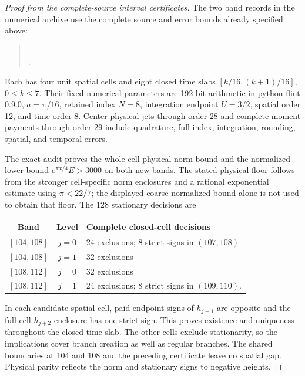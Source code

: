 \documentclass[11pt]{article}
\numberwithin{equation}{section}
\theoremstyle{definition}
\theoremstyle{remark}
\begin{document}
\begin{proof}[Proof from the complete-source interval certificates]
The two band records in the numerical archive use the complete source
and error bounds already specified above:
\begin{quote}\small\raggedright
{}\\
.
\end{quote}
Each
has four unit spatial cells and eight closed time slabs
$[k/16,(k+1)/16]$, $0\le k\le7$.  Their fixed numerical parameters
are 192-bit arithmetic in python-flint 0.9.0, $a=\pi/16$, retained
index $N=8$, integration endpoint $U=3/2$, spatial order 12, and time
order 8.  Center physical jets through order 28 and complete moment
payments through order 29 include quadrature, full-index, integration,
rounding, spatial, and temporal errors.

The exact audit proves the whole-cell physical norm bound and the
normalized lower bound $e^{\pi x/4}E>3000$ on both new bands.  The stated
physical floor follows from the stronger cell-specific norm enclosures
and a rational exponential estimate using $\pi<22/7$; the displayed
coarse normalized bound alone is not used to obtain that floor.  The 128 stationary decisions are
\begin{center}
\begin{tabular}{ccl}
Band&Level&Complete closed-cell decisions\\\hline
$[104,108]$&$j=0$&24 exclusions; 8 strict signs in $(107,108)$\\
$[104,108]$&$j=1$&32 exclusions\\
$[108,112]$&$j=0$&32 exclusions\\
$[108,112]$&$j=1$&24 exclusions; 8 strict signs in $(109,110)$.
\end{tabular}
\end{center}
In each candidate spatial cell, paid endpoint signs of $h_{j+1}$ are
opposite and the full-cell $h_{j+2}$ enclosure has one strict sign.
This proves existence and uniqueness throughout the closed time slab.
The other cells exclude stationarity, so the implications cover branch
creation as well as regular branches.  The shared boundaries at 104 and
108 and the preceding certificate leave no spatial gap.  Physical parity
reflects the norm and stationary signs to negative heights.


\end{proof}
\end{document}
